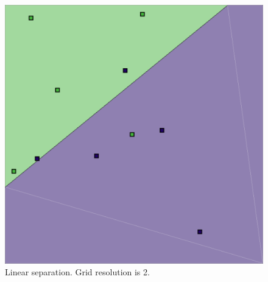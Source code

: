 \documentclass[12pt]{article}
\begin{document}
\begin{figure} 
\centering
  \includegraphics[width = 3 in]{2_res.png}
  \caption{Linear separation. Grid resolution is 2.
}
\end{figure}
\end{document}
